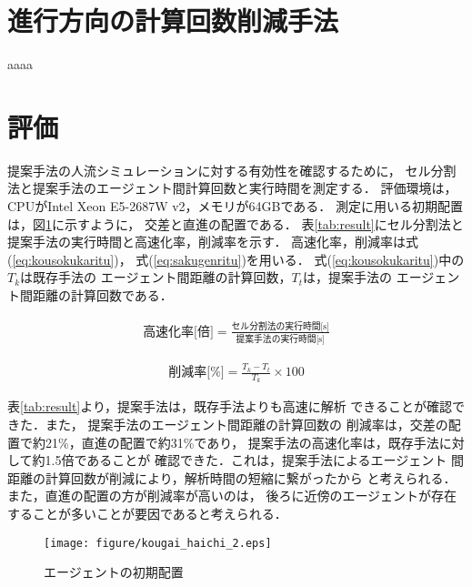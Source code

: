 \documentclass{maelab_y}
\begin{document}
\section{進行方向の計算回数削減手法}
aaaa

\section{評価}
提案手法の人流シミュレーションに対する有効性を確認するために，
セル分割法と提案手法のエージェント間計算回数と実行時間を測定する．
評価環境は，CPUがIntel Xeon E5-2687W v2，メモリが64GBである．
測定に用いる初期配置は，図\ref{fig:agent_haichi_image}に示すように，
交差と直進の配置である．
表\ref{tab:result}にセル分割法と提案手法の実行時間と高速化率，削減率を示す．
高速化率，削減率は式(\ref{eq:kousokukaritu})，
式(\ref{eq:sakugenritu})を用いる．
式(\ref{eq:kousokukaritu})中の$T_{k}$は既存手法の
エージェント間距離の計算回数，$T_{t}$は，提案手法の
エージェント間距離の計算回数である．

\begin{eqnarray}
  \label{eq:kousokukaritu}
  \mbox{高速化率[倍]} =
  \frac{\mbox{セル分割法の実行時間[s]}}{\mbox{提案手法の実行時間[s]}}
\end{eqnarray}

\begin{eqnarray}
  \label{eq:sakugenritu}
  \mbox{削減率[\%]} =
  \frac{T_{k} - T_{t}}{T_{k}} \times 100
\end{eqnarray}

表\ref{tab:result}より，提案手法は，既存手法よりも高速に解析
できることが確認できた．また，
提案手法のエージェント間距離の計算回数の
削減率は，交差の配置で約21\%，直進の配置で約31\%であり，
提案手法の高速化率は，既存手法に対して約1.5倍であることが
確認できた．これは，提案手法によるエージェント
間距離の計算回数が削減により，解析時間の短縮に繋がったから
と考えられる．また，直進の配置の方が削減率が高いのは，
後ろに近傍のエージェントが存在することが多いことが要因であると考えられる．

\begin{figure}[hbtp]
 \begin{center}
  \texttt{[image: figure/kougai\_haichi\_2.eps]}
  \caption{エージェントの初期配置}
  \label{fig:agent_haichi_image}
 \end{center}
\end{figure}
\fi
\end{document}
